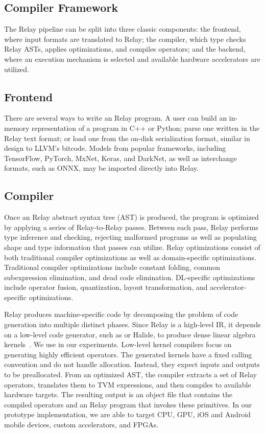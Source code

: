   \subsection{Compiler Framework}
  The Relay pipeline can be split into three classic components:
    the frontend, where input formats are translated to Relay;
    the compiler, which type checks Relay ASTs, applies optimizations,
      and compiles operators;
    and the backend, where an execution mechanism is selected and
      available hardware accelerators are utilized.

  \subsection{Frontend}

  There are several ways to write an Relay program.
  A user can build an in-memory representation of
    a program in C++ or Python;
    parse one written in the Relay text format;
    or load one from the on-disk serialization format,
    similar in design to LLVM's bitcode.
  Models from popular frameworks, including
    TensorFlow, PyTorch, MxNet, Keras, and DarkNet, as well as interchange
    formats, such as ONNX, may be imported directly into Relay.
  \subsection{Compiler}
  Once an Relay abstract syntax tree (AST) is produced,
    the program is optimized by applying a series of Relay-to-Relay
    passes.
  Between each pass, Relay performs type inference and checking,
    rejecting malformed programs as well as populating shape and type
    information that passes can utilize.
  Relay optimizations consist of both traditional compiler
    optimizations as well as domain-specific optimizations.
  Traditional compiler optimizations include constant folding,
    common subexpression elimination,
    and dead code elimination.
  DL-specific optimizations include
    operator fusion,
    quantization,
    layout transformation,
    and accelerator-specific optimizations.

  Relay produces machine-specific code
    by decomposing the problem of code generation into multiple distinct phases.
  Since Relay is a high-level IR, it depends on a low-level code generator,
    such as \tvm or Halide,
    to produce dense linear algebra kernels~\citep{tvm_osdi18, halide}.
  We use \tvm in our experiments.
  Low-level kernel compilers focus on generating highly efficient operators.
  The generated kernels have a fixed calling convention and do not
    handle allocation. Instead, they expect inputs and outputs to be preallocated.
  From an optimized AST,
    the compiler extracts a set of Relay operators,
    translates them to TVM expressions,
    and then compiles to available hardware targets.
  The resulting output is an
    object file that contains the compiled operators
    and an Relay program that invokes these primitives.
  In our prototype implementation,
    we are able to target CPU, GPU,
    iOS and Android mobile devices,
    custom accelerators, and FPGAs.
